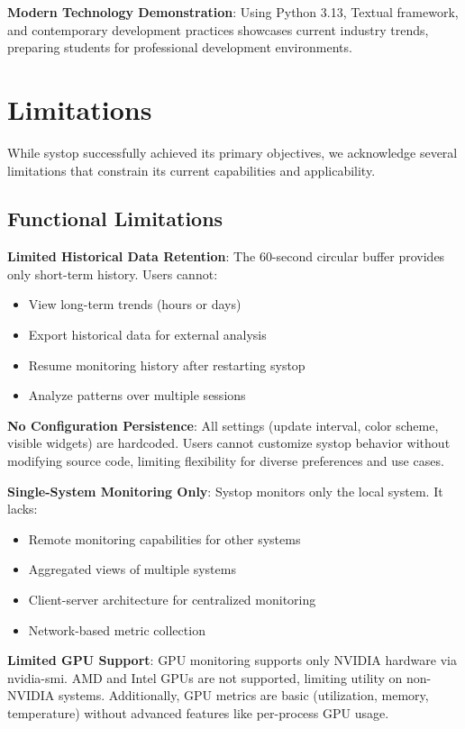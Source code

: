 \documentclass[12pt,a4paper,oneside]{report}
\begin{document}
\textbf{Modern Technology Demonstration}: Using Python 3.13, Textual framework, and contemporary development practices showcases current industry trends, preparing students for professional development environments.

\section{Limitations}
\label{sec:limitations}

While systop successfully achieved its primary objectives, we acknowledge several limitations that constrain its current capabilities and applicability.

\subsection{Functional Limitations}

\textbf{Limited Historical Data Retention}: The 60-second circular buffer provides only short-term history. Users cannot:
\begin{itemize}
    \item View long-term trends (hours or days)
    \item Export historical data for external analysis
    \item Resume monitoring history after restarting systop
    \item Analyze patterns over multiple sessions
\end{itemize}

\textbf{No Configuration Persistence}: All settings (update interval, color scheme, visible widgets) are hardcoded. Users cannot customize systop behavior without modifying source code, limiting flexibility for diverse preferences and use cases.

\textbf{Single-System Monitoring Only}: Systop monitors only the local system. It lacks:
\begin{itemize}
    \item Remote monitoring capabilities for other systems
    \item Aggregated views of multiple systems
    \item Client-server architecture for centralized monitoring
    \item Network-based metric collection
\end{itemize}

\textbf{Limited GPU Support}: GPU monitoring supports only NVIDIA hardware via nvidia-smi. AMD and Intel GPUs are not supported, limiting utility on non-NVIDIA systems. Additionally, GPU metrics are basic (utilization, memory, temperature) without advanced features like per-process GPU usage.
\end{document}
